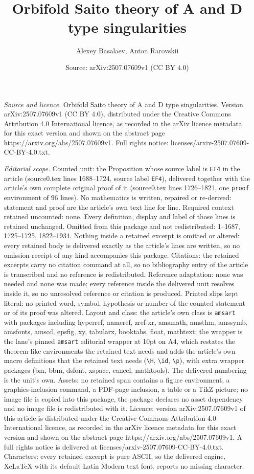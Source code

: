 \documentclass[10pt,a4paper]{amsart}
\title[Orbifold Saito theory of A and D type singularities]{Orbifold Saito theory of A and D type singularities}
\author{Alexey Basalaev, Anton Rarovskii}
\date{Source: arXiv:2507.07609v1 (CC BY 4.0)}
\begin{document}
\maketitle

\noindent\emph{Source and licence.} Orbifold Saito theory of A and D type singularities. Version arXiv:2507.07609v1 (CC BY 4.0), distributed under the Creative Commons Attribution 4.0 International licence, as recorded in the arXiv licence metadata for this exact version and shown on the abstract page https://arxiv.org/abs/2507.07609v1. Full rights notice: licenses/arxiv-2507.07609-CC-BY-4.0.txt.\par\smallskip

\noindent\textit{Editorial scope.} Counted unit: the Proposition whose source label is \texttt{EF4} in the article (source0.tex lines 1688--1724, source label \texttt{EF4}), delivered together with the article's own complete original proof of it (source0.tex lines 1726--1821, one \texttt{proof} environment of 96 lines). No mathematics is written, repaired or re-derived: statement and proof are the article's own text line for line. Required context retained uncounted: none. Every definition, display and label of those lines is retained unchanged. Omitted from this package and not redistributed: 1--1687, 1725--1725, 1822--1934. Nothing inside a retained excerpt is omitted or altered: every retained body is delivered exactly as the article's lines are written, so no omission receipt of any kind accompanies this package. Citations: the retained excerpts carry no citation command at all, so no bibliography entry of the article is transcribed and no reference is redistributed. Reference adaptation: none was needed and none was made; every reference inside the delivered unit resolves inside it, so no unresolved reference or citation is produced. Printed slips kept literal: no printed word, symbol, hypothesis or number of the counted statement or of its proof was altered. Layout and class: the article's own class is \texttt{amsart} with packages including hyperref, nameref, zref-xr, amsmath, amsthm, amssymb, amsfonts, amscd, epsfig, xy, tabularx, booktabs, float, mathtext; the wrapper is the lane's pinned \texttt{amsart} editorial wrapper at 10pt on A4, which restates the theorem-like environments the retained text needs and adds the article's own macro definitions that the retained text needs (\texttt{\textbackslash H}, \texttt{\textbackslash id}, \texttt{\textbackslash p}), with extra wrapper packages (bm, bbm, dsfont, xspace, cancel, mathtools). The delivered numbering is the unit's own. Assets: no retained span contains a figure environment, a graphics-inclusion command, a PDF-page inclusion, a table or a TikZ picture; no image file is copied into this package, the package declares no asset dependency and no image file is redistributed with it. Licence: version arXiv:2507.07609v1 of this article is distributed under the Creative Commons Attribution 4.0 International licence, as recorded in the arXiv licence metadata for this exact version and shown on the abstract page https://arxiv.org/abs/2507.07609v1. A full rights notice is delivered at licenses/arxiv-2507.07609-CC-BY-4.0.txt. Characters: every retained excerpt is pure ASCII, so the delivered engine, XeLaTeX with its default Latin Modern text font, reports no missing character.
\end{document}
